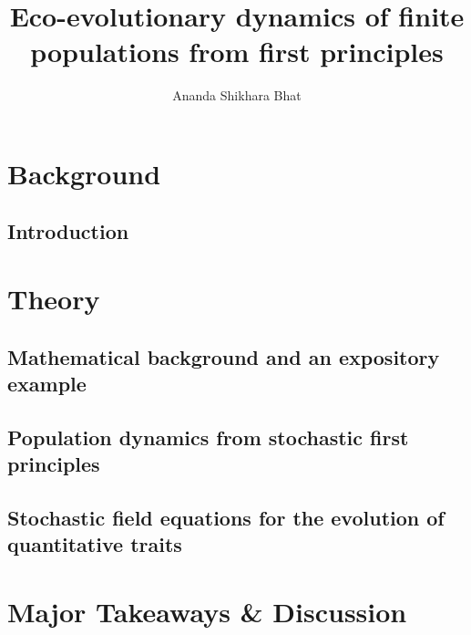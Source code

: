 \documentclass[twoside, 12pt]{iiser-thesis-modified}
\title{Eco-evolutionary dynamics of finite populations from first principles}
\author{Ananda Shikhara Bhat}
\begin{document}
\pagestyle{plain}
\thesisfront
\listoftables
{}
\listoffigures
{}

\part{Background}


\pagestyle{fancy}
\fancyhf{}
\fancyhead[LE,RO]{\thepage}
\fancyhead[CO]{\rule[-4ex]{0pt}{4ex}\footnotesize\itshape\nouppercase{\leftmark}}
\setlength{\headheight}{40pt} %
\renewcommand{\headrulewidth}{0pt}

\renewcommand{\chaptermark}[1]{\markboth{#1}{}} %
\renewcommand{\sectionmark}[1]{\markright{#1}} %


\chapter{Introduction}


\part{Theory}\label{part_theory}
\chapter{Mathematical background and an expository example}\label{chap_math_background}

\chapter{Population dynamics from stochastic first principles}\label{chap_BD}

\chapter{Stochastic field equations for the evolution of quantitative traits}\label{chap_infD_processes}


\part{Major Takeaways \& Discussion}\label{part_summary}
\end{document}
